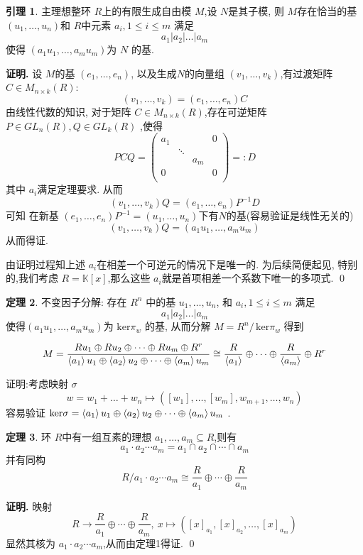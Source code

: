 \documentclass[12pt, a4paper,oneside, UTF8]{ctexart}
\theoremstyle{definition}
\newtheorem{lemma}{\indent 引理}    %
\newtheorem{thm}[lemma]{\indent 定理}
\theoremstyle{plain}
\renewenvironment{proof}{\par\textbf{证明.}\;}{\qed\par}
\begin{document}
\begin{lemma}
    主理想整环 $R$上的有限生成自由模 $M$,设 $N$是其子模, 则 $M$存在恰当的基 $(u_1, \ldots ,u_{n})$和 $R$中元素 $a_{i}, 1\leq i\leq m$ 满足
    $$a_{1}|a_{2}|\dots|a_{m}$$ 使得 $(a_1u_1, \ldots ,a_{m}u_{m})$为 $N$ 的基.
\end{lemma}
\begin{proof}
    设 $M$的基 $(e_1, \ldots ,e_{n})$, 以及生成$N$的向量组 $(v_1, \ldots ,v_{k})$,有过渡矩阵 $C\in  M_{n\times k}(R) $:
    \[
    (v_1, \ldots ,v_{k}) = (e_1, \ldots ,e_{n})C
    \]
    由线性代数的知识, 对于矩阵 $C\in M_{n\times k}(R)$,存在可逆矩阵 $P \in GL_{n}(R), Q \in GL_{k}(R)$ ,使得
    \[
    PCQ = \begin{pmatrix} a_1  &  &  &0  \\  & \ddots &  &  \\  &  & a_{m} &  \\ 0 &  &  & 0 \\\end{pmatrix} =:D
    \]
    其中 $a_{i}$满足定理要求. 从而$$(v_1, \ldots ,v_{k})Q =(e_1, \ldots ,e_{n})P^{-1} D$$
    可知 在新基 $(e_1, \ldots ,e_{n})P^{-1} =(u_1, \ldots ,u_{n})$下有$N$的基(容易验证是线性无关的) $$(v_1, \ldots ,v_{k})Q = (a_1u_1, \ldots ,a_{m}u_{m})$$ 从而得证.

    由证明过程知上述 $a_{i}$在相差一个可逆元的情况下是唯一的. 为后续简便起见, 特别的,我们考虑 $R = \mathbb{K}[x]$,那么这些 $a_{i}$就是首项相差一个系数下唯一的多项式.
\end{proof}
\begin{thm}
    不变因子分解:  存在 $R^{n}$ 中的基 $u_{1},\dots,u_{n}$, 和 $a_{i}, 1\leq i\leq m$ 满足
 $$a_{1}|a_{2}|\dots|a_{m}$$ 使得$(a_1u_1, \ldots ,a_{m}u_{m})$为 $\mathrm{ker}\pi _{w}$ 的基, 从而分解 $M = R^{n} / \,\mathrm{ker}\pi _{w}$ 得到

$$M = \frac{Ru_{1}\oplus Ru_{2}\oplus \dots \oplus Ru_{m}\oplus R^{r}}{\braket{ a_{1}} u_{1}\oplus \braket{ a_{2}} u_{2}\oplus \dots \oplus \braket{ a_{m}} u_{m}}\cong \frac{R}{\braket{ a_{1}}} \oplus \dots \oplus \frac{R}{\braket{ a_{m}} }\oplus R^{r}$$


证明:考虑映射 $\sigma$
$$w = w_{1}+\dots+w_{n} \mapsto ([w_{1}], \dots,[w_{m}], w_{m+1},\dots,w_{n})$$
容易验证 $\mathrm{ker}\sigma= \braket{ a_{1}} u_{1}\oplus \braket{ a_{2}} u_{2}\oplus \dots \oplus \braket{ a_{m}} u_{m}$ .


\end{thm}


\begin{thm}
    环 $R$中有一组互素的理想 $a_1, \ldots ,a_{m} \subseteq R$,则有
    \[
    a_1\cdot a_2 \cdots a_{m} = a_1 \cap a_2\cap \cdots\cap a_{m}
    \]
    并有同构
    \[
    R / a_1\cdot a_2\cdots a_{m} \cong \frac{R}{a_1} \oplus \cdots \oplus  \frac{R}{a_{m}}
    \]
\end{thm}
\begin{proof}
    映射 
    \[
    R \to \frac{R}{a_1} \oplus \cdots \oplus  \frac{R}{a_{m}} , \ x \mapsto ([x]_{a_1},[x]_{a_2}, \ldots ,[x]_{a_{m}})
    \]
    显然其核为 $ a_1\cdot a_2\cdots a_{m}$,从而由定理1得证.
\end{proof}
\end{document}
